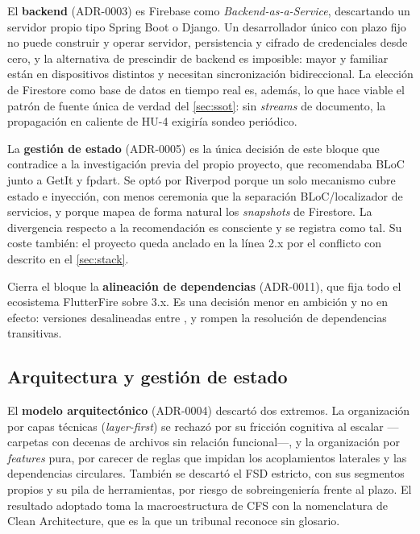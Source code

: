 El \textbf{backend} (ADR-0003) es Firebase como \emph{Backend-as-a-Service}, descartando un servidor propio
tipo Spring Boot o Django. Un desarrollador único con plazo fijo no puede construir y operar servidor,
persistencia y cifrado de credenciales desde cero, y la alternativa de prescindir de backend es imposible:
mayor y familiar están en dispositivos distintos y necesitan sincronización bidireccional. La elección de
Firestore como base de datos en tiempo real es, además, lo que hace viable el patrón de fuente única de
verdad del \autoref{sec:ssot}: sin \emph{streams} de documento, la propagación en caliente de HU-4 exigiría
sondeo periódico.

La \textbf{gestión de estado} (ADR-0005) es la única decisión de este bloque que contradice a la
investigación previa del propio proyecto, que recomendaba BLoC junto a GetIt y fpdart. Se optó por
Riverpod porque un solo mecanismo cubre estado e inyección, con menos ceremonia que la separación
BLoC/localizador de servicios, y porque  mapea de forma natural los \emph{snapshots}
de Firestore. La divergencia respecto a la recomendación es consciente y se registra como tal. Su coste
también: el proyecto queda anclado en la línea 2.x por el conflicto con  descrito en
el \autoref{sec:stack}.

Cierra el bloque la \textbf{alineación de dependencias} (ADR-0011), que fija todo el ecosistema FlutterFire
sobre  3.x. Es una decisión menor en ambición y no en efecto: versiones desalineadas
entre ,  y  rompen la resolución de
dependencias transitivas.

\subsection{Arquitectura y gestión de estado}

El \textbf{modelo arquitectónico} (ADR-0004) descartó dos extremos. La organización por capas técnicas
(\emph{layer-first}) se rechazó por su fricción cognitiva al escalar ---carpetas con decenas de archivos
sin relación funcional---, y la organización por \emph{features} pura, por carecer de reglas que impidan
los acoplamientos laterales y las dependencias circulares. También se descartó el FSD estricto, con sus
segmentos propios y su pila de herramientas, por riesgo de sobreingeniería frente al plazo. El resultado
adoptado toma la macroestructura de CFS con la nomenclatura de Clean Architecture, que es la que un
tribunal reconoce sin glosario.

